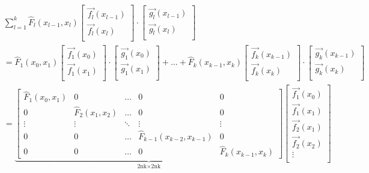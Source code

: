 \documentclass[11pt,reqno,oneside,a4paper]{article}
\theoremstyle{plain} %
\theoremstyle{definition}
\theoremstyle{remark}
\begin{document}
\begin{equation*}
\begin{aligned}
&\sum_{l=1}^{k} \widehat{F}_l(x_{l-1}, x_l) 
\begin{bmatrix}
\vec{f_l}(x_{l-1})  \\
\vec{f_l}(x_{l})  \\
\end{bmatrix}
\cdot
\begin{bmatrix}
\vec{g_l}(x_{l-1})  \\
\vec{g_l}(x_{l})  \\
\end{bmatrix} \\
&= 
\widehat{F}_1(x_0, x_1) \begin{bmatrix}
\vec{f_1}(x_0)  \\
\vec{f_1}(x_1)  \\
\end{bmatrix}
\cdot
\begin{bmatrix}
\vec{g_1}(x_0)  \\
\vec{g_1}(x_1)  \\
\end{bmatrix}
+ \ldots + 
\widehat{F}_k(x_{k-1}, x_k) \begin{bmatrix}
\vec{f_k}(x_{k-1})  \\
\vec{f_k}(x_k)  \\
\end{bmatrix}
\cdot
\begin{bmatrix}
\vec{g_k}(x_{k-1})  \\
\vec{g_k}(x_k)  \\
\end{bmatrix} \\
&= \underbrace{
\begin{bmatrix}
\widehat{F}_1(x_0, x_1) & 0 & \ldots & 0 & 0 \\
0 & \widehat{F}_2(x_1, x_2) & \ldots & 0 & 0 \\
\vdots & \vdots & \ddots & \vdots & \vdots \\
0 & 0 & \ldots & \widehat{F}_{k-1}(x_{k-2}, x_{k-1}) & 0 \\
0 & 0 & \ldots & 0 & \widehat{F}_k(x_{k-1}, x_k)
\end{bmatrix}}_\text{2nk$\times$2nk}
\begin{bmatrix}
\vec{f_1}(x_{0})  \\
\vec{f_1}(x_1) \\
\vec{f_2}(x_1)  \\
\vec{f_2}(x_2) \\
\vdots \\

\end{bmatrix}
\end{aligned}
\end{equation*}
\end{document}
